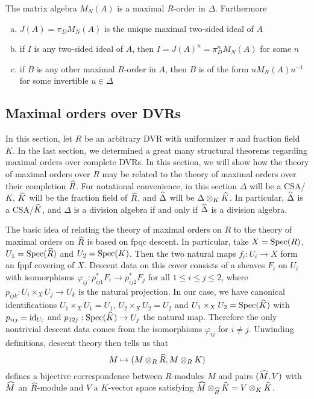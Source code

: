 \begin{thm}
The matrix algebra $M_N(A)$ is a maximal $R$-order in $\Delta$.  Furthermore
\begin{enumerate}[(a)]
\item  $J(A) = \pi_DM_N(A)$ is the unique maximal two-sided ideal of $A$
\item  if $I$ is any two-sided ideal of $A$, then $I = J(A)^n = \pi_D^n M_N(A)$ for some $n$
\item  if $B$ is any other maximal $R$-order in $A$, then $B$ is of the form $u M_N(A) u^{-1}$ for some invertible $u\in\Delta$
\end{enumerate}
\end{thm}

\subsection{Maximal orders over DVRs}
In this section, let $R$ be an arbitrary DVR with uniformizer $\pi$ and fraction field $K$.  In the last section, we determined a great many structural theorems regarding maximal orders over complete DVRs.  In this section, we will show how the theory of maximal orders over $R$ may be related to the theory of maximal orders over their completion $\widehat R$.  For notational convenience, in this section $\Delta$ will be a CSA/$K$, $\widehat K$ will be the fraction field of $\widehat R$, and $\widehat\Delta$ will be $\Delta\otimes_K \widehat K$.  In particular, $\widehat \Delta$ is a CSA/$\widehat K$, and $\Delta$ is a division algebra if and only if $\widehat \Delta$ is a division algebra.

The basic idea of relating the theory of maximal orders on $R$ to the theory of maximal orders on $\widehat R$ is based on fpqc descent.  In particular, take $X = \textnormal{Spec}(R)$, $U_1 = \textnormal{Spec}(\widehat R)$ and $U_2 = \textnormal{Spec}(K)$.  Then the two natural maps $f_i: U_i\rightarrow X$ form an fppf covering of $X$.  Descent data on this cover consists of a sheaves $F_i$ on $U_i$ with isomorphisms $\varphi_{ij}: p_{ij1}^*F_i\rightarrow p_{ij2}^*F_j$ for all $1\leq i\leq j\leq 2$, where $p_{ijk}:U_i\times_X U_j\rightarrow U_k$ is the natural projection.  In our case, we have canonical identifications $U_1\times_X U_1 = U_1$, $U_2\times_X U_2 = U_2$ and $U_1\times_X U_2 = \textnormal{Spec}(\widehat K)$ with $p_{iij} = \textnormal{id}_{U_i}$ and $p_{12j}:\textnormal{Spec}(\widehat K)\rightarrow U_j$ the natural map.  Therefore the only nontrivial descent data comes from the isomorphisms $\varphi_{ij}$ for $i\neq j$.  Unwinding definitions, descent theory then tells us that
$$M\mapsto (M\otimes_R\widehat{R},M\otimes_R K)$$
defines a bijective correspondence between $R$-modules $M$ and pairs $(\widehat M, V)$ with $\widehat M$ an $\widehat R$-module and $V$ a $K$-vector space satisfying $\widehat M\otimes_{\widehat R} \widehat K = V\otimes_K \widehat K$.

